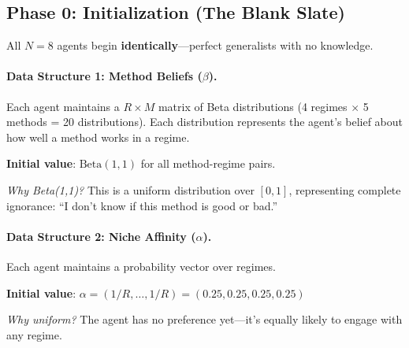 
\subsection{Phase 0: Initialization (The Blank Slate)}

All $N = 8$ agents begin \textbf{identically}---perfect generalists with no knowledge.

\paragraph{Data Structure 1: Method Beliefs ($\beta$).}

Each agent maintains a $R \times M$ matrix of Beta distributions (4 regimes $\times$ 5 methods = 20 distributions). Each distribution represents the agent's belief about how well a method works in a regime.

\textbf{Initial value}: $\text{Beta}(1, 1)$ for all method-regime pairs.

\textit{Why Beta(1,1)?} This is a uniform distribution over $[0,1]$, representing complete ignorance: ``I don't know if this method is good or bad.''

\paragraph{Data Structure 2: Niche Affinity ($\alpha$).}

Each agent maintains a probability vector over regimes.

\textbf{Initial value}: $\alpha = (1/R, \ldots, 1/R) = (0.25, 0.25, 0.25, 0.25)$

\textit{Why uniform?} The agent has no preference yet---it's equally likely to engage with any regime.

